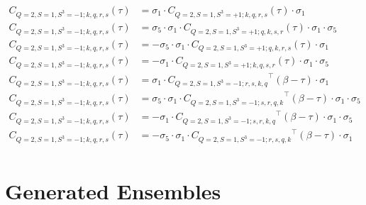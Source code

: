 \begin{equation}
  \begin{aligned}
    C_{Q=2,S=1,S^3=-1;k,q,r,s} (\tau) &= \sigma_1\cdot{C_{Q=2,S=1,S^3=+1;k,q,r,s}} (\tau) \cdot\sigma_1
    \\
    C_{Q=2,S=1,S^3=-1;k,q,r,s} (\tau) &= \sigma_5\cdot \sigma_1\cdot{C_{Q=2,S=1,S^3=+1;q,k,s,r}} (\tau) \cdot\sigma_1\cdot\sigma_5
    \\
    C_{Q=2,S=1,S^3=-1;k,q,r,s} (\tau) &= - \sigma_5\cdot \sigma_1\cdot{C_{Q=2,S=1,S^3=+1;q,k,r,s}} (\tau) \cdot\sigma_1
    \\
    C_{Q=2,S=1,S^3=-1;k,q,r,s} (\tau) &= - \sigma_1\cdot{C_{Q=2,S=1,S^3=+1;k,q,s,r}} (\tau) \cdot\sigma_1\cdot\sigma_5
    \\
    C_{Q=2,S=1,S^3=-1;k,q,r,s} (\tau) &= \sigma_1\cdot{C_{Q=2,S=1,S^3=-1;r,s,k,q}}^\top (\beta-\tau) \cdot\sigma_1 
    \\
    C_{Q=2,S=1,S^3=-1;k,q,r,s} (\tau) &= \sigma_5\cdot \sigma_1\cdot{C_{Q=2,S=1,S^3=-1;s,r,q,k}}^\top (\beta-\tau) \cdot\sigma_1\cdot\sigma_5
    \\
    C_{Q=2,S=1,S^3=-1;k,q,r,s} (\tau) &= - \sigma_1\cdot{C_{Q=2,S=1,S^3=-1;s,r,k,q}}^\top (\beta-\tau) \cdot\sigma_1\cdot\sigma_5 
    \\
    C_{Q=2,S=1,S^3=-1;k,q,r,s} (\tau) &= - \sigma_5\cdot \sigma_1\cdot{C_{Q=2,S=1,S^3=-1;r,s,q,k}}^\top (\beta-\tau) \cdot\sigma_1
    \\
  \end{aligned}
\end{equation}

\section{Generated Ensembles}
\label{app:all_ensembles}

